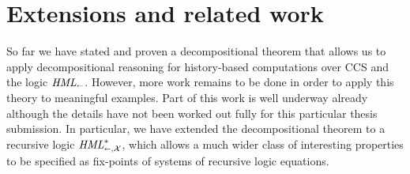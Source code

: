 \section{Extensions and related work} %
\label{sec:decomp_future}

So far we have stated and proven a decompositional theorem that allows us to
apply decompositional reasoning for history-based computations over CCS and
the logic $\textit{HML}_\shortleftarrow$. However, more work remains to be done in order to apply
this theory to meaningful examples. Part of this work is well underway already
although the details have not been worked out fully for this particular thesis
submission. In particular, we have extended the decompositional theorem to a
recursive logic $\textit{HML}_{\shortleftarrow,\mathcal{X}}^*$, which allows a much wider class of interesting 
properties to be specified as fix-points of systems of recursive logic equations.